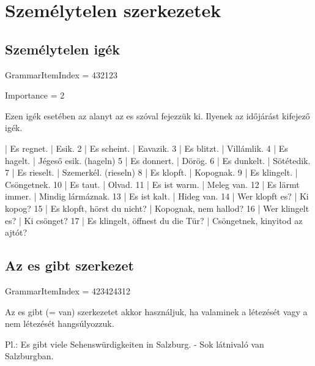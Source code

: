\documentclass{article}
\newenvironment{desc}{\verbatim}{\endverbatim}
\newenvironment{exmp}{\verbatim}{\endverbatim}
\begin{document}
\section{Személytelen szerkezetek}

\subsection{Személytelen igék}

GrammarItemIndex = 432123

Importance = 2

\begin{desc}
Ezen igék esetében az alanyt az es szóval fejezzük ki. Ilyenek az időjárást kifejező igék.
\end{desc}

\begin{exmp}
1 | Es regnet. | Esik.
2 | Es scheint. | Eavazik.
3 | Es blitzt. | Villámlik.
4 | Es hagelt. | Jégeső esik. (hageln)
5 | Es donnert. | Dörög.
6 | Es dunkelt. | Sötétedik.
7 | Es rieselt. | Szemerkél. (rieseln)
8 | Es klopft. | Kopognak.
9 | Es klingelt. | Csöngetnek.
10 | Es taut. | Olvad.
11 | Es ist warm. | Meleg van.
12 | Es lärmt immer. | Mindig lármáznak.
13 | Es ist kalt. | Hideg van.
14 | Wer klopft es? | Ki kopog?
15 | Es klopft, hörst du nicht? | Kopognak, nem hallod?
16 | Wer klingelt es? | Ki csönget?
17 | Es klingelt, öffnest du die Tür? | Csöngetnek, kinyitod az ajtót?
\end{exmp}

\subsection{Az es gibt szerkezet}

GrammarItemIndex = 423424312

\begin{desc}
Az es gibt (= van) szerkezetet akkor használjuk, ha valaminek a létezését vagy a nem létezését hangsúlyozzuk.

Pl.: Es gibt viele Sehenswürdigkeiten in Salzburg. - Sok látnivaló van Salzburgban.
\end{desc}
\end{document}
